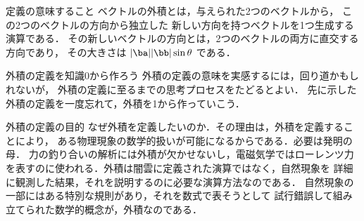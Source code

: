             \begin{mysmallsec}{定義の意味すること}
                ベクトルの外積とは，与えられた2つのベクトルから，
                この2つのベクトルの方向から独立した
                新しい方向を持つベクトルを1つ生成する演算である．
                その新しいベクトルの方向とは，2つのベクトルの両方に直交する方向であり，
                その大きさは $|\ba||\bb|\sin \theta$ である．
            \end{mysmallsec}

            \begin{mysmallsec}{外積の定義を知識0から作ろう}
                外積の定義の意味を実感するには，回り道かもしれないが，
                外積の定義に至るまでの思考プロセスをたどるとよい．
                先に示した外積の定義を一度忘れて，外積を1から作っていこう．
            \end{mysmallsec}

            \begin{mysmallsec}{外積の定義の目的}
                なぜ外積を定義したいのか．その理由は，外積を定義することにより，
                ある物理現象の数学的扱いが可能になるからである．必要は発明の母．
                力の釣り合いの解析には外積が欠かせないし，電磁気学ではローレンツ力
                を表すのに使われる．外積は闇雲に定義された演算ではなく，自然現象を
                詳細に観測した結果，それを説明するのに必要な演算方法なのである．
                自然現象の一部にはある特別な規則があり，それを数式で表そうとして
                試行錯誤して組み立てられた数学的概念が，外積なのである．
            \end{mysmallsec}

